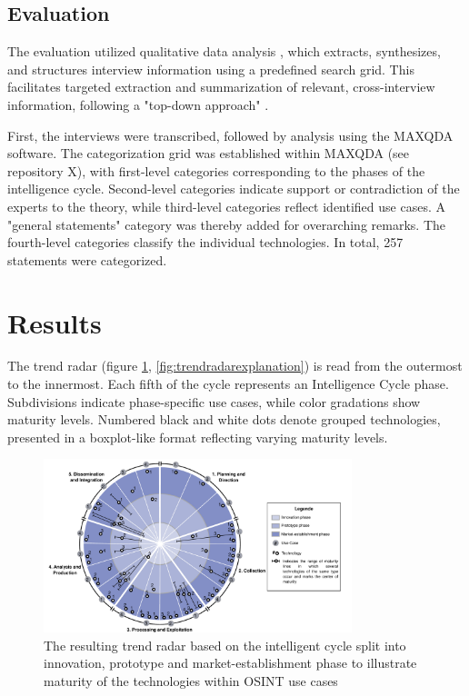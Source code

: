 \documentclass[10pt]{article}
\begin{document}
\subsection{Evaluation} \label{sec:eval}

The evaluation utilized qualitative data analysis \cite{Glaser.2009}, which extracts, synthesizes, and structures interview information using a predefined search grid. This facilitates targeted extraction and summarization of relevant, cross-interview information, following a "top-down approach" \cite{Bogner.2014, Glaser.2009}.

First, the interviews were transcribed, followed by analysis using the MAXQDA software. The categorization grid was established within MAXQDA (see repository X), with first-level categories corresponding to the phases of the intelligence cycle. Second-level categories indicate support or contradiction of the experts to the theory, while third-level categories reflect identified use cases. A "general statements" category was thereby added for overarching remarks. The fourth-level categories classify the individual technologies. In total, 257 statements were categorized.

\section{Results} \label{sec:results}

The trend radar (figure \ref{fig:trendradar}, \ref{fig:trendradarexplanation}) is read from the outermost to the innermost.
Each fifth of the cycle represents an Intelligence Cycle phase. Subdivisions indicate
phase-specific use cases, while color gradations show maturity levels. Numbered black
and white dots denote grouped technologies, presented in a boxplot-like format reflecting
varying maturity levels.

\begin{figure}[thb]
    \centering
    \includegraphics[width=0.8\textwidth]{PDF/images/crop_Trendradar}
    \caption{The resulting trend radar based on the intelligent cycle split into innovation, prototype and market-establishment phase to illustrate maturity of the technologies within OSINT use cases}
    \label{fig:trendradar}
\end{figure}
\end{document}
